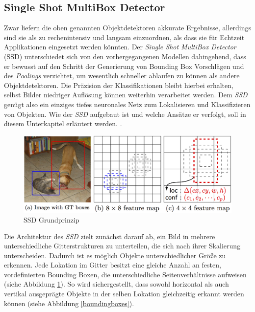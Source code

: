\subsection{Single Shot MultiBox Detector}

Zwar liefern die oben genannten Objektdetektoren akkurate Ergebnisse, allerdings sind sie als zu rechenintensiv und langsam einzuordnen, als dass sie für Echtzeit Applikationen eingesetzt werden könnten. Der \textit{Single Shot MultiBox Detector} (SSD) unterschiedet sich von den vorhergegangenen Modellen dahingehend, dass er bewusst auf den Schritt der Generierung von Bounding Box Vorschlägen und des \textit{Poolings} verzichtet, um wesentlich schneller ablaufen zu können als andere Objektdetektoren. Die Präzision der Klassifikationen bleibt hierbei erhalten, selbst Bilder niedriger Auflösung können weiterhin verarbeitet werden. Dem \textit{SSD} genügt also ein einziges tiefes neuronales Netz zum Lokalisieren und Klassifizieren von Objekten. Wie der \textit{SSD} aufgebaut ist und welche Ansätze er verfolgt, soll in diesem Unterkapitel erläutert werden. \cite[S. 1f.]{ssd.20161229}. 

\begin{figure}[ht]
	\begin{center}
		\includegraphics[width=15cm]{Bilder/ssd_framework.png} 
		\caption[SSD Grundprinzip]{SSD Grundprinzip \cite[S. 3]{ssd.20161229}}
		\label{framework}
	\end{center}
\end{figure}

Die Architektur des \textit{SSD} zielt zunächst darauf ab, ein Bild in mehrere unterschiedliche Gitterstrukturen zu unterteilen, die sich nach ihrer Skalierung unterscheiden. Dadurch ist es möglich Objekte unterschiedlicher Größe zu erkennen. Jede Lokation im Gitter besitzt eine gleiche Anzahl an festen, vordefinierten Bounding Boxen, die unterschiedliche Seitenverhältnisse aufweisen (siehe Abbildung \ref{framework}). So wird sichergestellt, dass sowohl horizontal als auch vertikal ausgeprägte Objekte in der selben Lokation gleichzeitig erkannt werden können (siehe Abbildung \ref{boundingboxes}). \cite[S. 3]{ssd.20161229}

